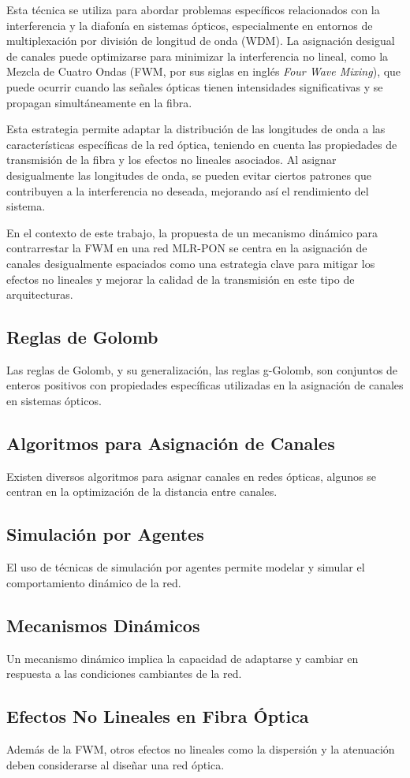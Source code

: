 Esta técnica se utiliza para abordar problemas específicos relacionados con la interferencia y la diafonía en sistemas ópticos, especialmente en entornos de multiplexación por división de longitud de onda (WDM). La asignación desigual de canales puede optimizarse para minimizar la interferencia no lineal, como la Mezcla de Cuatro Ondas (FWM, por sus siglas en inglés \textit{Four Wave Mixing}), que puede ocurrir cuando las señales ópticas tienen intensidades significativas y se propagan simultáneamente en la fibra.

Esta estrategia permite adaptar la distribución de las longitudes de onda a las características específicas de la red óptica, teniendo en cuenta las propiedades de transmisión de la fibra y los efectos no lineales asociados. Al asignar desigualmente las longitudes de onda, se pueden evitar ciertos patrones que contribuyen a la interferencia no deseada, mejorando así el rendimiento del sistema.

En el contexto de este trabajo, la propuesta de un mecanismo dinámico para contrarrestar la FWM en una red MLR-PON se centra en la asignación de canales desigualmente espaciados como una estrategia clave para mitigar los efectos no lineales y mejorar la calidad de la transmisión en este tipo de arquitecturas.


\subsection{Reglas de Golomb}
Las reglas de Golomb, y su generalización, las reglas g-Golomb, son conjuntos de enteros positivos con propiedades específicas utilizadas en la asignación de canales en sistemas ópticos.

\subsection{Algoritmos para Asignación de Canales}
Existen diversos algoritmos para asignar canales en redes ópticas, algunos se centran en la optimización de la distancia entre canales.

\subsection{Simulación por Agentes}
El uso de técnicas de simulación por agentes permite modelar y simular el comportamiento dinámico de la red.

\subsection{Mecanismos Dinámicos}
Un mecanismo dinámico implica la capacidad de adaptarse y cambiar en respuesta a las condiciones cambiantes de la red.

\subsection{Efectos No Lineales en Fibra Óptica}
Además de la FWM, otros efectos no lineales como la dispersión y la atenuación deben considerarse al diseñar una red óptica.

